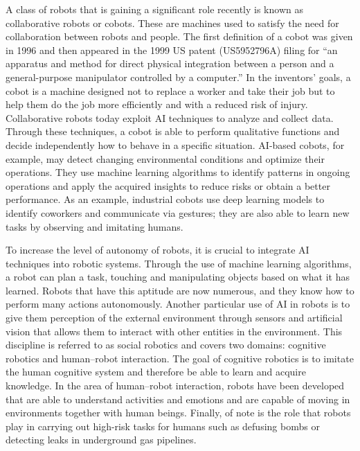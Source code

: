 A class of robots that is gaining a significant role recently is known as collaborative robots or cobots. These are machines used to satisfy the need for collaboration between robots and people. The first definition of a cobot was given in 1996 and then appeared in the 1999 US patent (US5952796A) filing for ``an apparatus and method for direct physical integration between a person and a general-purpose manipulator controlled by a computer.'' In the inventors' goals, a cobot is a machine designed not to replace a worker and take their job but to help them do the job more efficiently and with a reduced risk of injury. Collaborative robots today exploit AI techniques to analyze and collect data. Through these techniques, a cobot is able to perform qualitative functions and decide independently how to behave in a specific situation. AI-based cobots, for example, may detect changing environmental conditions and optimize their operations. They use machine learning algorithms to identify patterns in ongoing operations and apply the acquired insights to reduce risks or obtain a better performance. As an example, industrial cobots use deep learning models to identify coworkers and communicate via gestures; they are also able to learn new tasks by observing and imitating humans.

To increase the level of autonomy of robots, it is crucial to integrate AI techniques into robotic systems. Through the use of machine learning algorithms, a robot can plan a task, touching and manipulating objects based on what it has learned. Robots that have this aptitude are now numerous, and they know how to perform many actions autonomously. Another particular use of AI in robots is to give them perception of the external environment through sensors and artificial vision that allows them to interact with other entities in the environment. This discipline is referred to as social robotics and covers two domains: cognitive robotics and human--robot interaction. The goal of cognitive robotics is to imitate the human cognitive system and therefore be able to learn and acquire knowledge. In the area of human--robot interaction, robots have been developed that are able to understand activities and emotions and are capable of moving in environments together with human beings. Finally, of note is the role that robots play in carrying out high-risk tasks for humans such as defusing bombs or detecting leaks in underground gas pipelines.

